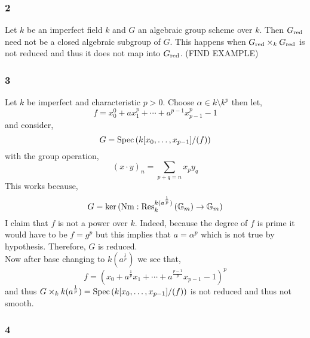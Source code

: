 \documentclass[12pt]{article}
\begin{document}
\subsubsection{2}

Let $k$ be an imperfect field $k$ and $G$ an algebraic group scheme over $k$. Then $G_{\mathrm{red}}$ need not be a closed algebraic subgroup of $G$. This happens when $G_{\mathrm{red}} \times_k G_{\mathrm{red}}$ is not reduced and thus it does not map into $G_{\mathrm{red}}$. (FIND EXAMPLE)

\subsubsection{3}

Let $k$ be imperfect and characteristic $p > 0$. Choose $\alpha \in k \setminus k^p$ then let,
\[ f = x_0^0 + a x_1^p + \cdots + a^{p-1} x_{p-1}^p - 1 \]
and consider,
\[ G = \mathrm{Spec}\left( k[x_0, \dots, x_{p-1}]/(f) \right) \]
with the group operation,
\[ (x \cdot y)_n = \sum_{p + q = n} x_p y_q \]
This works because,
\[ G = \ker{(\mathrm{Nm} : \mathrm{Res}^{k(a^{\frac{1}{p}})}_{k} \left( \mathbb{G}_m\right) \to \mathbb{G}_m)} \]
I claim that $f$ is not a power over $k$. Indeed, because the degree of $f$ is prime it would have to be $f = g^p$ but this implies that $a = \alpha^p$ which is not true by hypothesis. Therefore, $G$ is reduced.
\bigskip\\
Now after base changing to $k(a^{\frac{1}{p}})$ we see that,
\[ f = (x_0 + a^{\frac{1}{p}} x_1 + \cdots + a^{\frac{p-1}{p}} x_{p-1} - 1)^p \]
and thus $G \times_k k(a^{\frac{1}{p}}) = \mathrm{Spec}\left( k[x_0, \dots, x_{p-1}]/(f) \right)$ is not reduced and thus not smooth. 

\renewcommand{\GL}{\mathrm{GL}}
\renewcommand{\SL}{\mathrm{SL}}

\subsubsection{4}
\end{document}
